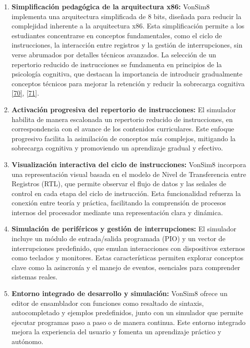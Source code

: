 \documentclass[12pt,oneside]{templates/unerthesis}
\begin{document}
\begin{enumerate}
\def\labelenumi{\arabic{enumi}.}
\item
  \textbf{Simplificación pedagógica de la arquitectura x86:}
  VonSim8 implementa una arquitectura simplificada de 8 bits, diseñada para reducir la complejidad inherente a la arquitectura x86. Esta simplificación permite a los estudiantes concentrarse en conceptos fundamentales, como el ciclo de instrucciones, la interacción entre registros y la gestión de interrupciones, sin verse abrumados por detalles técnicos avanzados. La selección de un repertorio reducido de instrucciones se fundamenta en principios de la psicología cognitiva, que destacan la importancia de introducir gradualmente conceptos técnicos para mejorar la retención y reducir la sobrecarga cognitiva \protect\hyperlink{ref-nationalacademies2018how}{{[}70{]}}, \protect\hyperlink{ref-sweller2010cognitive}{{[}71{]}}.
\item
  \textbf{Activación progresiva del repertorio de instrucciones:}
  El simulador habilita de manera escalonada un repertorio reducido de instrucciones, en correspondencia con el avance de los contenidos curriculares. Este enfoque progresivo facilita la asimilación de conceptos más complejos, mitigando la sobrecarga cognitiva y promoviendo un aprendizaje gradual y efectivo.
\item
  \textbf{Visualización interactiva del ciclo de instrucciones:}
  VonSim8 incorpora una representación visual basada en el modelo de Nivel de Transferencia entre Registros (RTL), que permite observar el flujo de datos y las señales de control en cada etapa del ciclo de instrucción. Esta funcionalidad refuerza la conexión entre teoría y práctica, facilitando la comprensión de procesos internos del procesador mediante una representación clara y dinámica.
\item
  \textbf{Simulación de periféricos y gestión de interrupciones:}
  El simulador incluye un módulo de entrada/salida programada (PIO) y un vector de interrupciones predefinido, que emulan interacciones con dispositivos externos como teclados y monitores. Estas características permiten explorar conceptos clave como la asincronía y el manejo de eventos, esenciales para comprender sistemas reales.
\item
  \textbf{Entorno integrado de desarrollo y simulación:}
  VonSim8 ofrece un editor de ensamblador con funciones como resaltado de sintaxis, autocompletado y ejemplos predefinidos, junto con un simulador que permite ejecutar programas paso a paso o de manera continua. Este entorno integrado mejora la experiencia del usuario y fomenta un aprendizaje práctico y autónomo.

\end{enumerate}
\end{document}

